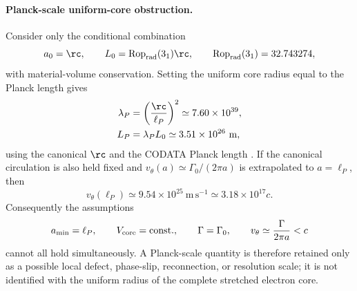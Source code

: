 \paragraph{Planck-scale uniform-core obstruction.}
Consider only the conditional combination
\begin{equation}
    a_0=\rc,
    \qquad
    L_0=\operatorname{Rop}_{\rm rad}(3_1)\rc,
    \qquad
    \operatorname{Rop}_{\rm rad}(3_1)=32.743274,
    \label{eq:rt_planck_stretch_reference}
\end{equation}
with material-volume conservation.  Setting the uniform core radius equal to
the Planck length gives
\begin{align}
    \lambda_P
    &=
    \left(\frac{\rc}{\ell_P}\right)^2
    \simeq
    7.60\times10^{39},
    \\
    L_P
    &=
    \lambda_PL_0
    \simeq
    3.51\times10^{26}\ \mathrm m,
    \label{eq:rt_planck_uniform_core_length}
\end{align}
using the canonical $\rc$ and the CODATA Planck length
\cite{Mohr2025CODATA}.  If the canonical circulation is also held fixed and
$v_\theta(a)\simeq\Gamma_0/(2\pi a)$ is extrapolated to $a=\ell_P$, then
\begin{equation}
    v_\theta(\ell_P)
    \simeq
    9.54\times10^{25}\ \mathrm{m\,s^{-1}}
    \simeq
    3.18\times10^{17}c.
    \label{eq:rt_planck_uniform_core_speed_obstruction}
\end{equation}
Consequently the assumptions
\begin{equation}
    a_{\min}=\ell_P,
    \qquad
    V_{\rm core}=\mathrm{const.},
    \qquad
    \Gamma=\Gamma_0,
    \qquad
    v_\theta\simeq\frac{\Gamma}{2\pi a}<c
    \label{eq:rt_planck_incompatible_assumptions}
\end{equation}
cannot all hold simultaneously.  A Planck-scale quantity is therefore retained
only as a possible local defect, phase-slip, reconnection, or resolution scale;
it is not identified with the uniform radius of the complete stretched
electron core.

